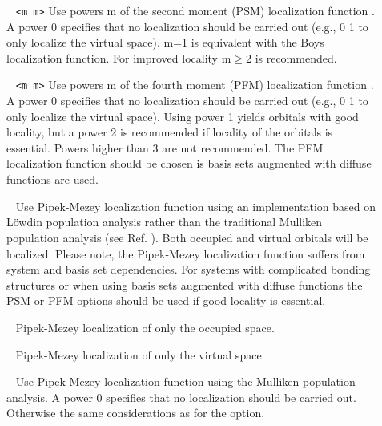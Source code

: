 \begin{description}

\item[]\verb| | \newline
\verb|<m m>|\newline
Use powers m of the second moment (PSM) localization function \cite{jansik:2011}.  A power 0 specifies that no localization should be carried out (e.g., 0 1  to only localize the virtual space). m=1 is equivalent with the Boys localization function. For improved locality m$\ge$2 is recommended. 

\item[]\verb| | \newline
\verb|<m m>|\newline
Use powers m of the fourth moment (PFM) localization function \cite{hoyvik:PFM}.  A power 0 specifies that no localization should be carried out (e.g., 0 1  to only localize the virtual space). Using power 1 yields orbitals with good locality, but a power 2 is recommended if locality of the orbitals is essential. Powers higher than 3 are not recommended.  The PFM localization function should be chosen is basis sets augmented with diffuse functions are used.

\item[]\verb| | \newline
Use Pipek-Mezey localization function using an implementation based on L{\"o}wdin population analysis 
rather than the traditional Mulliken population analysis (see Ref. \cite{hoyvik:PM}).  Both occupied and virtual orbitals will be localized. Please note, the Pipek-Mezey localization function suffers from system and basis set dependencies. For systems with complicated bonding structures or when using basis sets augmented with diffuse functions the PSM or PFM options should be used if good locality is essential.

\item[]\verb| | \newline
Pipek-Mezey localization of only the occupied space.


\item[]\verb| | \newline
Pipek-Mezey localization of only the virtual space.


\item[]\verb| | \newline
Use Pipek-Mezey localization function using the Mulliken population analysis. A power 0 specifies that no localization should be carried out.  Otherwise the same considerations as for the  option.



\end{description}
